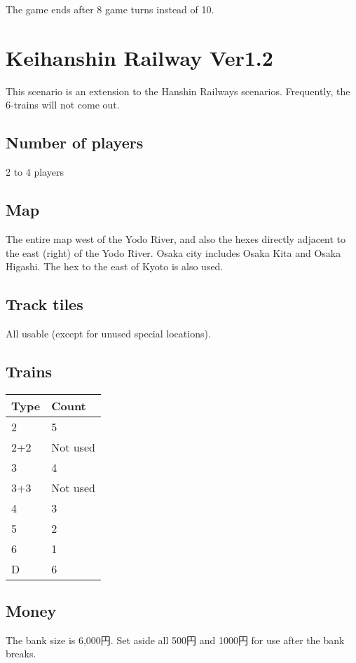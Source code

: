 \documentclass{article}
\begin{document}
\begin{CJK}{UTF8}{min}
\begin{multicols}{2}
The game ends after 8 game turns instead of 10.

\newpage
\section{Keihanshin Railway Ver1.2}

This scenario is an extension to the Hanshin Railways
scenarios. Frequently, the 6-trains will not come out.

\subsection{Number of players}

2 to 4 players

\subsection{Map}

The entire map west of the Yodo River, and also the hexes directly
adjacent to the east (right) of the Yodo River. Osaka city includes
Osaka Kita and Osaka Higashi. The hex to the east of Kyoto is also
used.

\subsection{Track tiles}

All usable (except for unused special locations).

\subsection{Trains}

\begin{tabular}{ll}
Type & Count \\
\hline
2 & 5 \\
2+2 & Not used \\
3 & 4 \\
3+3 & Not used \\
4 & 3 \\
5 & 2 \\
6 & 1 \\
D & 6 \\
\end{tabular}

\subsection{Money}
The bank size is 6,000円. Set aside all 500円 and 1000円 for
use after the bank breaks.


\end{multicols}
\end{CJK}
\end{document}
